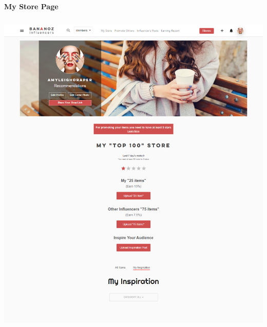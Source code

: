 \pagebreak
\textbf{My Store Page}
\begin{center}
\includegraphics[height=16cm,width=14cm]{Admin/my-store.png}
\end{center}

\pagebreak


\pagebreak

